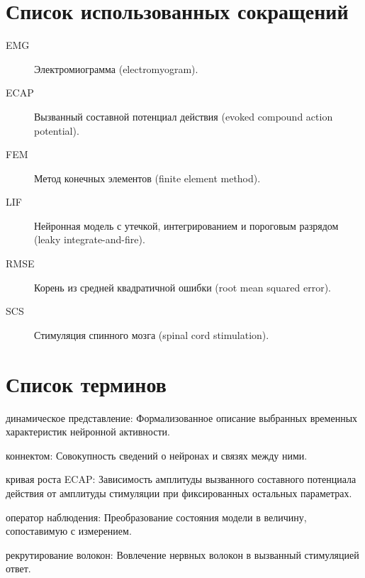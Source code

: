\chapter*{Список использованных сокращений}
\begin{description}
\item[EMG] Электромиограмма (electromyogram).
\item[ECAP] Вызванный составной потенциал действия (evoked compound action potential).
\item[FEM] Метод конечных элементов (finite element method).
\item[LIF] Нейронная модель с утечкой, интегрированием и пороговым разрядом (leaky integrate-and-fire).
\item[RMSE] Корень из средней квадратичной ошибки (root mean squared error).
\item[SCS] Стимуляция спинного мозга (spinal cord stimulation).
\end{description}

\chapter*{Список терминов}
\noindent динамическое представление: Формализованное описание выбранных временных характеристик нейронной активности.\par
\noindent коннектом: Совокупность сведений о нейронах и связях между ними.\par
\noindent кривая роста ECAP: Зависимость амплитуды вызванного составного потенциала действия от амплитуды стимуляции при фиксированных остальных параметрах.\par
\noindent оператор наблюдения: Преобразование состояния модели в величину, сопоставимую с измерением.\par
\noindent рекрутирование волокон: Вовлечение нервных волокон в вызванный стимуляцией ответ.\par
